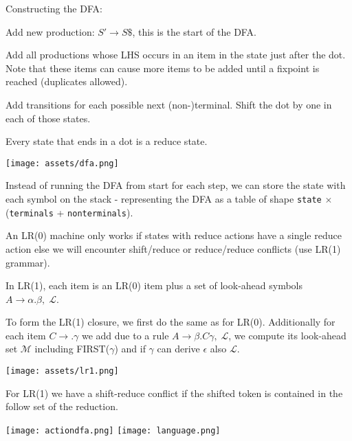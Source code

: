 Constructing the DFA:
\begin{compactitem}[$\quad\bullet$]
	\item Add new production: $S' \to S\$$, this is the start of the DFA.

	\item Add all productions whose LHS occurs in an item in the state just after the dot. Note that these items can cause more items to be added until a fixpoint is reached (duplicates allowed).

	\item Add transitions for each possible next (non-)terminal. Shift the dot by one in each of those states.

	\item Every state that ends in a dot is a reduce state.
\end{compactitem}
\vspace{-10pt}
\begin{center}
	\texttt{[image: assets/dfa.png]}
\end{center}
\vspace{-10pt}

Instead of running the DFA from start for each step, we can store the state with each symbol on the stack - representing the DFA as a table of shape \texttt{state} $\times$ (\texttt{terminals} + \texttt{nonterminals}). \medskip

An LR(0) machine only works if states with reduce actions have a single reduce action else we will encounter shift/reduce or reduce/reduce conflicts (use LR(1) grammar). \medskip

In LR(1), each item is an LR(0) item plus a set of look-ahead symbols $A \to \alpha . \beta, \; \mathcal L$.\medskip

To form the LR(1) closure, we first do the same as for LR(0). Additionally for each item $C \to . \gamma$ we add due to a rule $A \to \beta . C \gamma, \; \mathcal L$, we compute its look-ahead set $\mathcal M$ including FIRST($\gamma$) and if $\gamma$ can derive $\epsilon$ also $\mathcal L$. \medskip

\vspace{-15pt}
\begin{center}
	\texttt{[image: assets/lr1.png]}
\end{center}
\vspace{-10pt}
For LR(1) we have a shift-reduce conflict if the shifted token is contained in the follow set of the reduction.

\begin{multicols*}{2}
	\texttt{[image: actiondfa.png]}
	\texttt{[image: language.png]}
\end{multicols*}

